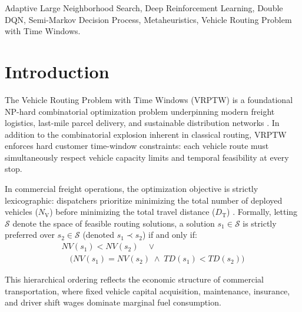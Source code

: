\documentclass{ieeeaccess}
\newcommand{\NV}{{N_\mathrm{V}}}
\newcommand{\TD}{{D_\mathrm{T}}}
\begin{document}
\begin{keywords}
Adaptive Large Neighborhood Search, Deep Reinforcement Learning, Double DQN, Semi-Markov Decision Process, Metaheuristics, Vehicle Routing Problem with Time Windows.
\end{keywords}

\titlepgskip=-15pt

\maketitle

\titlepgskip=11pt

\section{Introduction}
\label{sec:introduction}

The Vehicle Routing Problem with Time Windows (VRPTW) is a foundational NP-hard combinatorial optimization problem underpinning modern freight logistics, last-mile parcel delivery, and sustainable distribution networks \cite{Dantzig1959, Solomon1987}. In addition to the combinatorial explosion inherent in classical routing, VRPTW enforces hard customer time-window constraints: each vehicle route must simultaneously respect vehicle capacity limits and temporal feasibility at every stop.

In commercial freight operations, the optimization objective is strictly lexicographic: dispatchers prioritize minimizing the total number of deployed vehicles ($\NV$) before minimizing the total travel distance ($\TD$) \cite{Toth2014, braysy2005vehicle}. Formally, letting $\mathcal{S}$ denote the space of feasible routing solutions, a solution $s_1 \in \mathcal{S}$ is strictly preferred over $s_2 \in \mathcal{S}$ (denoted $s_1 \prec s_2$) if and only if:
\begin{multline}
  NV(s_1) < NV(s_2) \quad \lor \\
  \quad \big(NV(s_1) = NV(s_2) \;\land\; TD(s_1) < TD(s_2)\big)
  \label{eq:lexicographic_intro}
\end{multline}

This hierarchical ordering reflects the economic structure of commercial transportation, where fixed vehicle capital acquisition, maintenance, insurance, and driver shift wages dominate marginal fuel consumption.
\end{document}

